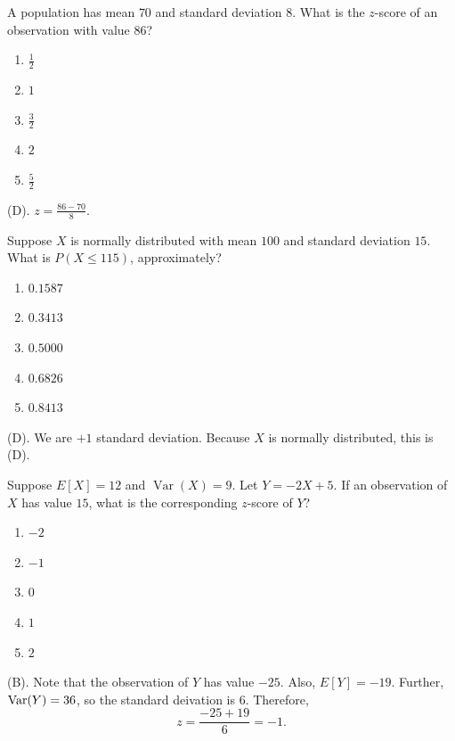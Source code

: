 \begin{exercise}
A population has mean $70$ and standard deviation
$8$. What is the $z$-score of an observation
with value $86$?

\begin{enumerate}[label=(\Alph*)]
\item $\frac12$
\item $1$
\item $\frac32$
\item $2$
\item $\frac52$
\end{enumerate}
\end{exercise}
\begin{solution}
(D). $z = \frac{86 - 70}{8}$.
\end{solution}

\begin{exercise}
Suppose $X$ is normally distributed with
mean $100$ and standard deviation $15$.
What is $P(X\le115)$, approximately?

\begin{enumerate}[label=(\Alph*)]
\item $0.1587$
\item $0.3413$
\item $0.5000$
\item $0.6826$
\item $0.8413$
\end{enumerate}
\end{exercise}
\begin{solution}
(D). We are $+1$ standard deviation. Because $X$ is normally distributed, 
this is (D).
\end{solution}

\begin{exercise}
Suppose $E[X]=12$ and $\operatorname{Var}(X)=9$. Let $Y=-2X+5$.
If an observation of $X$ has value $15$, what is the corresponding $z$-score of $Y$?
\begin{enumerate}[label=(\Alph*)]
\item $-2$
\item $-1$
\item $0$
\item $1$
\item $2$
\end{enumerate}
\end{exercise}
\begin{solution}
(B). Note that the observation of $Y$ has value $-25$. Also, 
$E[Y] = -19$. Further, $\operatorname{Var}(Y) = 36$, so the standard deivation is $6$. Therefore, 
\[
z = \frac{-25 + 19}{6} = -1.
\]
\end{solution}

